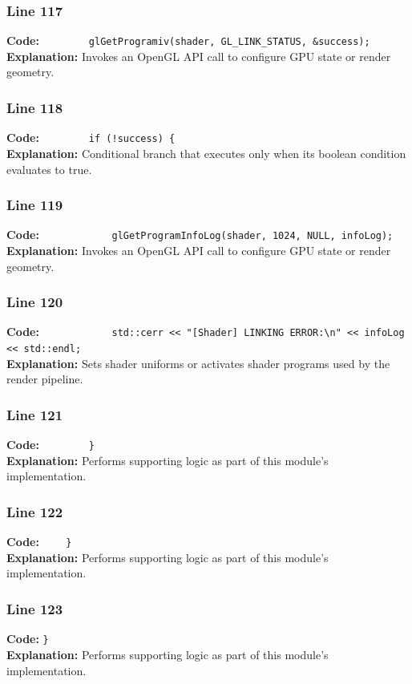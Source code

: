 \documentclass[11pt,a4paper]{article}
\begin{document}
\subsubsection*{Line 117}
\textbf{Code:} \verb|        glGetProgramiv(shader, GL_LINK_STATUS, &success);|\\
\textbf{Explanation:} Invokes an OpenGL API call to configure GPU state or render geometry.

\subsubsection*{Line 118}
\textbf{Code:} \verb|        if (!success) {|\\
\textbf{Explanation:} Conditional branch that executes only when its boolean condition evaluates to true.

\subsubsection*{Line 119}
\textbf{Code:} \verb|            glGetProgramInfoLog(shader, 1024, NULL, infoLog);|\\
\textbf{Explanation:} Invokes an OpenGL API call to configure GPU state or render geometry.

\subsubsection*{Line 120}
\textbf{Code:} \verb|            std::cerr << "[Shader] LINKING ERROR:\n" << infoLog << std::endl;|\\
\textbf{Explanation:} Sets shader uniforms or activates shader programs used by the render pipeline.

\subsubsection*{Line 121}
\textbf{Code:} \verb|        }|\\
\textbf{Explanation:} Performs supporting logic as part of this module's implementation.

\subsubsection*{Line 122}
\textbf{Code:} \verb|    }|\\
\textbf{Explanation:} Performs supporting logic as part of this module's implementation.

\subsubsection*{Line 123}
\textbf{Code:} \verb|}|\\
\textbf{Explanation:} Performs supporting logic as part of this module's implementation.
\end{document}
